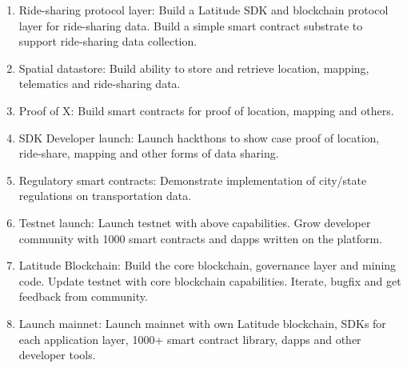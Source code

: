 \begin{enumerate}
    \item Ride-sharing protocol layer: Build a Latitude SDK and blockchain protocol layer for ride-sharing data. Build a
        simple smart contract substrate to support ride-sharing data collection.
    \item Spatial datastore: Build ability to store and retrieve location, mapping, telematics and ride-sharing data.
    \item Proof of X: Build smart contracts for proof of location, mapping and others.
    \item SDK Developer launch: Launch hackthons to show case proof of location, ride-share, mapping and other forms of
        data sharing.
    \item Regulatory smart contracts: Demonstrate implementation of city/state regulations on transportation data.
    \item Testnet launch: Launch testnet with above capabilities. Grow developer community with 1000 smart contracts and
        dapps written on the platform.
    \item Latitude Blockchain: Build the core blockchain, governance layer and mining code. Update testnet with core
        blockchain capabilities. Iterate, bugfix and get feedback from community.
    \item Launch mainnet: Launch mainnet with own Latitude blockchain, SDKs for each application layer, 1000+ smart
        contract library, dapps and other developer tools.
\end{enumerate}
